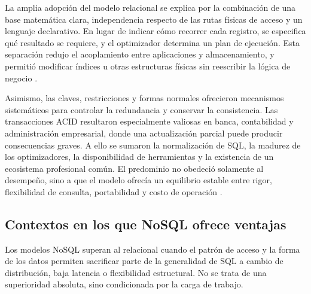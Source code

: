 La amplia adopción del modelo relacional se explica por la combinación de una
base matemática clara, independencia respecto de las rutas físicas de acceso y
un lenguaje declarativo. En lugar de indicar cómo recorrer cada registro, se
especifica qué resultado se requiere, y el optimizador determina un plan de
ejecución. Esta separación redujo el acoplamiento entre aplicaciones y
almacenamiento, y permitió modificar índices u otras estructuras físicas sin
reescribir la lógica de negocio \citep{codd1970}.

Asimismo, las claves, restricciones y formas normales ofrecieron mecanismos
sistemáticos para controlar la redundancia y conservar la consistencia. Las
transacciones ACID resultaron especialmente valiosas en banca, contabilidad y
administración empresarial, donde una actualización parcial puede producir
consecuencias graves. A ello se sumaron la normalización de SQL, la madurez de
los optimizadores, la disponibilidad de herramientas y la existencia de un
ecosistema profesional común. El predominio no obedeció solamente al desempeño,
sino a que el modelo ofrecía un equilibrio estable entre rigor, flexibilidad de
consulta, portabilidad y costo de operación \citep{dbconcepts}.

\subsection*{Contextos en los que NoSQL ofrece ventajas}

Los modelos NoSQL superan al relacional cuando el patrón de acceso y la forma
de los datos permiten sacrificar parte de la generalidad de SQL a cambio de
distribución, baja latencia o flexibilidad estructural. No se trata de una
superioridad absoluta, sino condicionada por la carga de trabajo.

